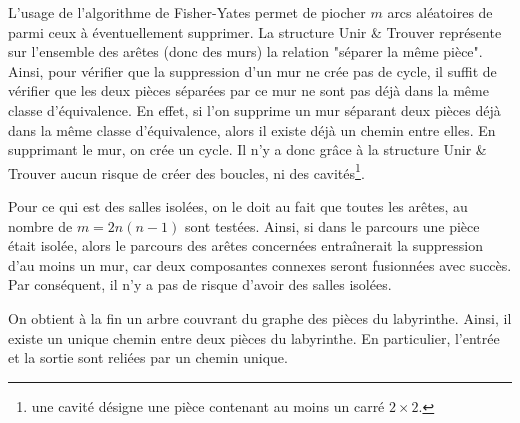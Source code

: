 L'usage de l'algorithme de Fisher-Yates permet de piocher $m$ arcs aléatoires de parmi ceux à éventuellement supprimer. La structure Unir \& Trouver représente sur l'ensemble des arêtes (donc des murs) la relation "séparer la même pièce". Ainsi, pour vérifier que la suppression d'un mur ne crée pas de cycle, il suffit de vérifier que les deux pièces séparées par ce mur ne sont pas déjà dans la même classe d'équivalence. En effet, si l'on supprime un mur séparant deux pièces déjà dans la même classe d'équivalence, alors il existe déjà un chemin entre elles. En supprimant le mur, on crée un cycle. Il n'y a donc grâce à la structure Unir \& Trouver aucun risque de créer des boucles, ni des cavités\footnote{une cavité désigne une pièce contenant au moins un carré $2 \times 2$.}.\par
Pour ce qui est des salles isolées, on le doit au fait que toutes les arêtes, au nombre de $m = 2n(n-1)$ sont testées. Ainsi, si dans le parcours une pièce était isolée, alors le parcours des arêtes concernées entraînerait la suppression d'au moins un mur, car deux composantes connexes seront fusionnées avec succès. Par conséquent, il n'y a pas de risque d'avoir des salles isolées.\par
On obtient à la fin un arbre couvrant du graphe des pièces du labyrinthe. Ainsi, il existe un unique chemin entre deux pièces du labyrinthe. En particulier, l'entrée et la sortie sont reliées par un chemin unique.
